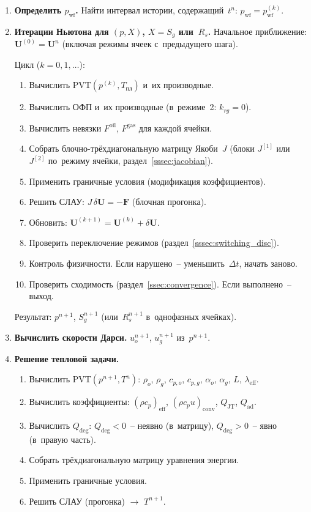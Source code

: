 \documentclass[12pt,a4paper]{article}
\newcommand{\pwf}{p_{\mathrm{wf}}}
\newcommand{\Tpl}{T_{\text{пл}}}
\newcommand{\rhocpeff}{(\rho c_p)_{\mathrm{eff}}}
\newcommand{\rhocpconv}{(\rho c_p u)_{\mathrm{conv}}}
\newcommand{\leff}{\lambda_{\mathrm{eff}}}
\newcommand{\QJT}{Q_{\mathrm{JT}}}
\newcommand{\Qad}{Q_{\mathrm{ad}}}
\newcommand{\Qdeg}{Q_{\mathrm{deg}}}
\begin{document}
\begin{enumerate}[leftmargin=*, label=\textbf{Шаг \arabic*.}]

\item \textbf{Определить $\pwf$.}
  Найти интервал истории, содержащий~$t^n$: $\pwf = \pwf^{(k)}$.

\item \textbf{Итерации Ньютона для $(p, X)$, $X = S_g$ или~$R_s$.}
  Начальное приближение: $\mathbf{U}^{(0)} = \mathbf{U}^n$
  (включая режимы ячеек с~предыдущего шага).

  Цикл ($k = 0, 1, \ldots$):
  \begin{enumerate}[nosep, label=(\alph*)]
    \item Вычислить PVT$(p^{(k)}, \Tpl)$ и~их производные.
    \item Вычислить ОФП и~их производные (в~режиме~2: $k_{rg}=0$).
    \item Вычислить невязки $F^{\text{oil}}$, $F^{\text{gas}}$
          для каждой ячейки.
    \item Собрать блочно-трёхдиагональную матрицу Якоби~$J$
          (блоки $J^{[1]}$ или~$J^{[2]}$ по~режиму ячейки,
          раздел~\ref{sssec:jacobian}).
    \item Применить граничные условия (модификация коэффициентов).
    \item Решить СЛАУ: $J\,\delta\mathbf{U} = -\mathbf{F}$
          (блочная прогонка).
    \item Обновить: $\mathbf{U}^{(k+1)} = \mathbf{U}^{(k)}
          + \delta\mathbf{U}$.
    \item Проверить переключение режимов
          (раздел~\ref{sssec:switching_disc}).
    \item Контроль физичности. Если нарушено~-- уменьшить~$\Delta t$,
          начать заново.
    \item Проверить сходимость (раздел~\ref{ssec:convergence}).
          Если выполнено~-- выход.
  \end{enumerate}
  Результат: $p^{n+1}$, $S_g^{n+1}$ (или~$R_s^{n+1}$ в~однофазных
  ячейках).

\item \textbf{Вычислить скорости Дарси.}
  $u_o^{n+1}$, $u_g^{n+1}$ из~$p^{n+1}$.

\item \textbf{Решение тепловой задачи.}
  \begin{enumerate}[nosep, label=(\alph*)]
    \item Вычислить PVT$(p^{n+1}, T^n)$: $\rho_o$, $\rho_g$, $c_{p,o}$,
          $c_{p,g}$, $\alpha_o$, $\alpha_g$, $L$, $\leff$.
    \item Вычислить коэффициенты: $\rhocpeff$, $\rhocpconv$, $\QJT$,
          $\Qad$.
    \item Вычислить $\Qdeg$: $\Qdeg < 0$~-- неявно (в~матрицу),
          $\Qdeg > 0$~-- явно (в~правую часть).
    \item Собрать трёхдиагональную матрицу уравнения энергии.
    \item Применить граничные условия.
    \item Решить СЛАУ (прогонка) $\to$ $T^{n+1}$.
  \end{enumerate}


\end{enumerate}
\end{document}
